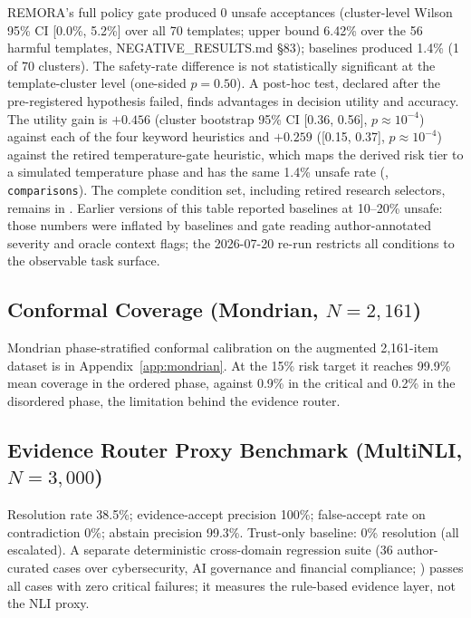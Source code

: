 \documentclass[10pt,twocolumn]{article}
\begin{document}
REMORA's full policy gate produced 0 unsafe acceptances (cluster-level
Wilson 95\% CI [0.0\%, 5.2\%] over all 70 templates; upper bound 6.42\%
over the 56 harmful templates, NEGATIVE\_RESULTS.md \S83); baselines
produced 1.4\% (1 of 70 clusters). The safety-rate difference is not
statistically significant at the template-cluster level (one-sided
$p=0.50$). A post-hoc test, declared after the pre-registered hypothesis
failed, finds advantages in decision utility and accuracy. The utility
gain is $+0.456$ (cluster bootstrap 95\% CI [0.36, 0.56],
$p\approx10^{-4}$) against each of the four keyword heuristics and
$+0.259$ ([0.15, 0.37], $p\approx10^{-4}$) against the retired
temperature-gate heuristic, which maps the derived risk tier to a
simulated temperature phase and has the same 1.4\% unsafe rate
(, \texttt{comparisons}). The complete condition set, including retired research
selectors, remains in .
Earlier versions of this table reported baselines at
10--20\% unsafe: those numbers were inflated by baselines and gate
reading author-annotated severity and oracle context flags; the 2026-07-20
re-run restricts all conditions to the observable task surface.

\subsection{Conformal Coverage (Mondrian, \texorpdfstring{$N=2{,}161$}{N=2,161})}

Mondrian phase-stratified conformal calibration on the augmented
2{,}161-item dataset is in Appendix~\ref{app:mondrian}. At the 15\% risk
target it reaches 99.9\% mean coverage in the ordered phase, against
0.9\% in the critical and 0.2\% in the disordered phase, the limitation
behind the evidence router.

\subsection{Evidence Router Proxy Benchmark (MultiNLI, \texorpdfstring{$N=3{,}000$}{N=3,000})}

Resolution rate 38.5\%; evidence-accept precision 100\%;
false-accept rate on contradiction 0\%; abstain precision 99.3\%.
Trust-only baseline: 0\% resolution (all escalated).
A separate deterministic cross-domain regression suite (36 author-curated
cases over cybersecurity, AI governance and financial compliance;
) passes all cases with zero
critical failures; it measures the rule-based evidence layer, not the NLI
proxy.
\end{document}
